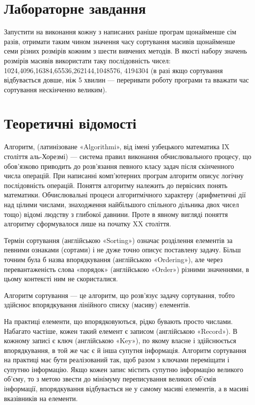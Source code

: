 \documentclass{article}
\begin{document}
\begin{normalsize}
		\section*{Лабораторне завдання}

		\begin{center}
			Запустити на виконання кожну з написаних раніше програм щонайменше сім разів, отримати таким чином значення часу сортування масивів щонайменше семи різних розмірів кожним з шести вивчених методів. В якості набору значень розмірів масивів використати таку послідовність чисел: 1024,4096,16384,65536,262144,1048576, 4194304 (в разі якщо сортування відбувається довше, ніж 5 хвилин — переривати роботу програми та вважати час сортування нескінченно великим).
		\end{center}
		
		\section*{Теоретичні відомості}
		Алгоритм, (латинізоване «Algorithmi», від імені узбецького математика IX століття аль-Хорезмі) — система правил виконання обчислювального процесу, що обов’язково приводить до розв’язання певного класу задач після скінченного числа операцій. При написанні комп’ютерних програм алгоритм описує логічну послідовність операцій. Поняття алгоритму належить до первісних понять математики. Обчислювальні процеси алгоритмічного характеру (арифметичні дії над цілими числами, знаходження найбільшого спільного дільника двох чисел тощо) відомі людству з глибокої давнини. Проте в явному вигляді поняття алгоритму сформувалося лише на початку XX століття.
		
		Термін сортування (англійською «Sorting») означає розділення елементів за певними ознаками (сортами) і не дуже точно описує поставлену задачу. Більш точним була б назва впорядкування (англійською «Ordering»), але через перевантаженість слова «порядок» (англійською «Order») різними значеннями, в цьому контексті ним не скористалися.
		
		Алгоритм сортування — це алгоритм, що розв'язує задачу сортування, тобто здійснює впорядкування лінійного списку (масиву) елементів.
		
		На практиці елементи, що впорядковуються, рідко бувають просто числами. Набагато частіше, кожен такий елемент є записом (англійською «Record»). В кожному записі є ключ (англійською «Key»), по якому власне і здійснюється впорядкування, в той же час є й інша супутня інформація. Алгоритм сортування на практиці має бути реалізований так, щоб разом з ключами переміщати і супутню інформацію. Якщо кожен запис містить супутню інформацію великого об’єму, то з метою звести до мінімуму переписування великих об’ємів інформації, впорядкування відбувається не у самому масиві елементів, а в масиві вказівників на елементи.
		

\end{normalsize}
\end{document}
